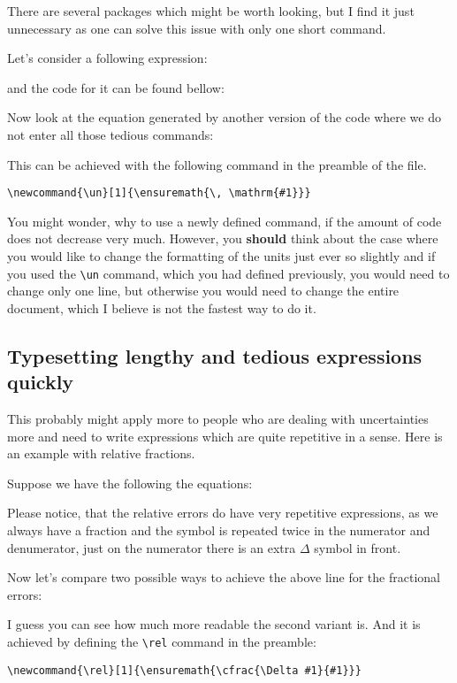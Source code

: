 \documentclass{scrartcl}
\newcommand{\un}[1]{\unit{#1}}
\begin{document}
There are several packages which might be worth looking, but I find it just
unnecessary as one can solve this issue with only one short command.

Let's consider a following expression:

and the code for it can be found bellow:


Now look at the equation generated by another version of the code where we do
not enter all those tedious commands:



This can be achieved with the following command in the preamble of the file.
\begin{lstlisting}
\newcommand{\un}[1]{\ensuremath{\, \mathrm{#1}}}
\end{lstlisting}

You might wonder, why to use a newly defined command, if the amount of code
does not decrease very much. However, you \textbf{should} think about the case
where you would like to change the formatting of the units just ever so slightly
and if you used the \verb|\un| command, which you had defined previously, you
would need to change only one line, but otherwise you would need to change the
entire document, which I believe is not the fastest way to do it.

\subsection{Typesetting lengthy and tedious expressions quickly}

This probably might apply more to people who are dealing with uncertainties more
and need to write expressions which are quite repetitive in a sense. Here is an
example with relative fractions.

Suppose we have the following the equations:


Please notice, that the relative errors do have very repetitive expressions,
as we always have a fraction and the symbol is repeated twice in the numerator
and denumerator, just on the numerator there is an extra $\Delta$ symbol in
front.

Now let's compare two possible ways to achieve the above line for the fractional
errors:



I guess you can see how much more readable the second variant is. And it is
achieved by defining the \verb|\rel| command in the preamble:
\begin{lstlisting}
\newcommand{\rel}[1]{\ensuremath{\cfrac{\Delta #1}{#1}}}
\end{lstlisting}
\end{document}
